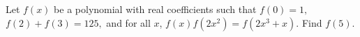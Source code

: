 Let $f(x)$ be a polynomial with real coefficients such that $f(0) = 1,$ $f(2)+f(3)=125,$ and for all $x$, $f(x)f(2x^{2})=f(2x^{3}+x).$ Find $f(5).$